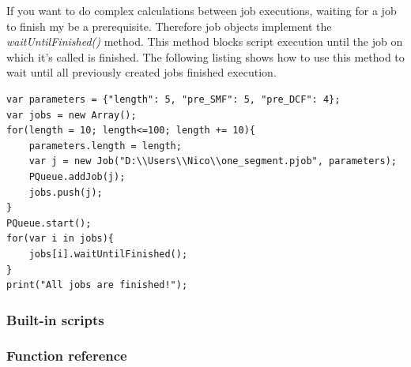 If you want to do complex calculations between job executions,
waiting for a job to finish my be a prerequisite.
Therefore job objects implement the \textit{waitUntilFinished()} method.
This method blocks script execution until the job on which it's called is finished.
The following listing shows how to use this method to wait until all previously created jobs finished execution.
\begin{lstlisting}
var parameters = {"length": 5, "pre_SMF": 5, "pre_DCF": 4};
var jobs = new Array();
for(length = 10; length<=100; length += 10){
	parameters.length = length;
	var j = new Job("D:\\Users\\Nico\\one_segment.pjob", parameters);
	PQueue.addJob(j);
	jobs.push(j);
}
PQueue.start();
for(var i in jobs){
	jobs[i].waitUntilFinished();
}
print("All jobs are finished!");
\end{lstlisting}



\subsubsection{Built-in scripts}
\label{pqueue:scripts:built-in}

\newpage
\subsubsection{Function reference}

